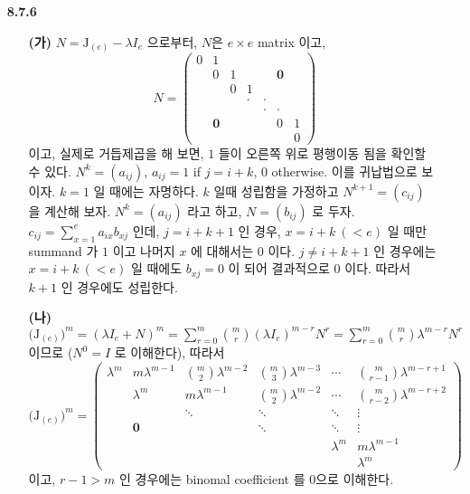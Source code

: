 \documentclass[12pt]{report}
\begin{document}
\begin{itemize}
\item[\textbf{8.7.6}]
	\begin{itemize}
		\item[\textbf{(가)}] $N = \mathrm{J}_{(e)}-\lambda I_e$ 으로부터, $N$은 $e\times e$ matrix 이고,
		$$N = \begin{pmatrix} 0 & 1  \\ &0&1&&&\mathbf{0}\\&&0&1 \\ &&&\cdot&\cdot\\&&&&\cdot&\cdot \\ &\mathbf{0}&&&&0&1\\&&&&&&0  \end{pmatrix}$$ 이고, 실제로 거듭제곱을 해 보면, $1$ 들이 오른쪽 위로 평행이동 됨을 확인할 수 있다. $N^k = (a_{ij})$, $a_{ij} = 1$ if $j = i+k$, $0$ otherwise. 이를 귀납법으로 보이자. $k = 1$ 일 때에는 자명하다. $k$ 일때 성립함을 가정하고 $N^{k+1} = (c_{ij})$ 을 계산해 보자. $N^k=(a_{ij})$ 라고 하고, $N=(b_{ij})$ 로 두자. \\
		$c_{ij} = \sum_{x=1}^{e} a_{ix}b_{xj}$ 인데, $j = i+k+1$ 인 경우, $x=i+k\: (<e)$ 일 때만 summand 가 $1$ 이고 나머지 $x$ 에 대해서는 $0$ 이다. $j \neq i+k+1$ 인 경우에는 $x=i+k\: (<e)$ 일 때에도 $b_{xj} = 0$ 이 되어 결과적으로 $0$ 이다. 따라서 $k+1$ 인 경우에도 성립한다. 
		\item[\textbf{(나)}] $\big(\mathrm{J}_{(e)}\big)^m = (\lambda I_e+N)^m = \sum_{r= 0}^m {m\choose r}(\lambda I_e)^{m-r}N^r=\sum_{r=0}^m {m\choose r}\lambda^{m-r}N^r$ 이므로 ($N^0=I$ 로 이해한다), 따라서 $$\big(\mathrm{J}_{(e)}\big)^m = \begin{pmatrix}\lambda^m&m\lambda^{m-1}&{m \choose 2} \lambda^{m-2}&{m \choose 3} \lambda^{m-3}&\cdots&{m \choose r-1} \lambda^{m-r+1} \\ &\lambda^m&m\lambda^{m-1}&{m \choose 2} \lambda^{m-2}&\cdots&{m \choose r-2} \lambda^{m-r+2}\\ &&\ddots&\ddots&\ddots&\vdots\\&\mathbf{0}&&\ddots&\ddots&\vdots\\&&&&\lambda^m&m\lambda^{m-1}\\&&&&&\lambda^m\end{pmatrix}$$ 이고, $r-1 > m$ 인 경우에는 binomal coefficient 를 0으로 이해한다.
	\end{itemize}


\end{itemize}
\end{document}
